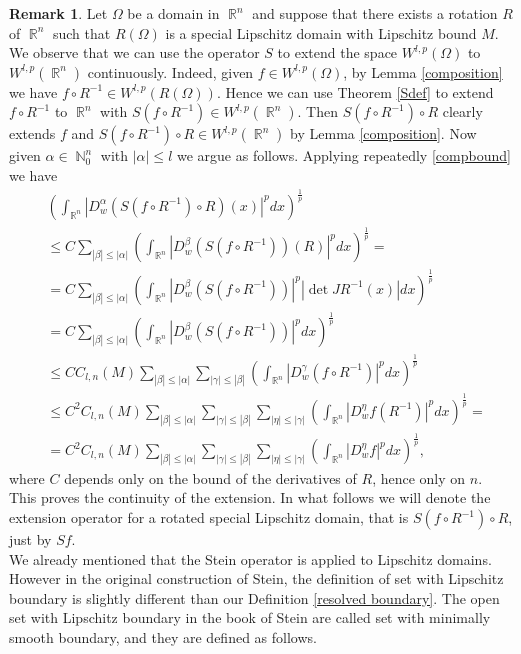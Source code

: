 \documentclass[12pt]{article}
\theoremstyle{definition}
\newtheorem{remark}{Remark}
\DeclareMathOperator\rr{\mathbb{R}}
\DeclareMathOperator\nn{\mathbb{N}}
\begin{document}
\begin{remark}\label{rotlip}
Let $\Omega$ be a domain in $\rr^n$ and suppose that there exists a rotation $R$ of $\rr^n$ such that $R(\Omega)$ is a special Lipschitz domain with Lipschitz bound $M$. We observe that we can use the operator $S$ to extend the space $W^{l,p}(\Omega)$ to $W^{l,p}(\rr^n)$ continuously. Indeed, given $f \in W^{l,p}(\Omega)$, by Lemma \ref{composition} we have $f\circ R^{-1} \in W^{l,p}(R(\Omega))$. Hence we can use Theorem \ref{Sdef} to extend  $f\circ R^{-1}$ to $\rr^n$ with $S(f\circ R^{-1})\in W^{l,p}(\rr^n).$ Then $S(f\circ R^{-1})\circ R$ clearly extends $f$ and $S(f\circ R^{-1})\circ R \in W^{l,p}(\rr^n)$ by Lemma \ref{composition}. Now given $\alpha \in \nn^n_0$ with $|\alpha|\le l$ we argue as follows. Applying repeatedly \eqref{compbound} we have
\begin{align*}
&\left( \int_{\rr^n} |D^\alpha_w(S(f\circ R^{-1})\circ R)(x)|^pdx \right)^\frac{1}{p} \\
&\le C \sum_{|\beta|\le |\alpha|} \left( \int_{\rr^n} |D^\beta_w(S(f\circ R^{-1}))(R)|^p dx\right)^\frac{1}{p}=\\
&= C \sum_{|\beta|\le |\alpha|} \left( \int_{\rr^n} |D^\beta_w(S(f\circ R^{-1}))|^p |\det JR^{-1}(x)| dx\right)^\frac{1}{p}\\
&= C \sum_{|\beta|\le |\alpha|} \left( \int_{\rr^n} |D^\beta_w(S(f\circ R^{-1}))|^p  dx\right)^\frac{1}{p} \\
&\le CC_{l,n}(M)  \sum_{|\beta|\le |\alpha|} \sum_{|\gamma|\le |\beta|}\left( \int_{\rr^n} |D^\gamma_w(f\circ R^{-1})|^p  dx\right)^\frac{1}{p}\\
&\le C^2C_{l,n}(M)  \sum_{|\beta|\le |\alpha|} \sum_{|\gamma|\le |\beta|} \sum_{|\eta|\le |\gamma|}\left( \int_{\rr^n} |D^\eta_wf(R^{-1})|^p  dx\right)^\frac{1}{p}=\\
&= C^2C_{l,n}(M)  \sum_{|\beta|\le |\alpha|} \sum_{|\gamma|\le |\beta|} \sum_{|\eta|\le |\gamma|}\left( \int_{\rr^n} |D^\eta_w f|^p  dx\right)^\frac{1}{p},
\end{align*}
where $C$ depends only on the bound of the derivatives of $R$, hence only on $n$. This proves the continuity of the extension. In what follows we will denote the extension operator for a rotated special Lipschitz domain, that is $S(f\circ R^{-1})\circ R$, just by $Sf$.\\
 We already mentioned that the Stein operator is applied to Lipschitz domains. However in the original construction of Stein, the definition of set with Lipschitz boundary is slightly different than our Definition \ref{resolved boundary}. The open set with Lipschitz boundary in the book of Stein are called set with minimally smooth boundary, and they are defined as follows.
\end{remark}
\end{document}
